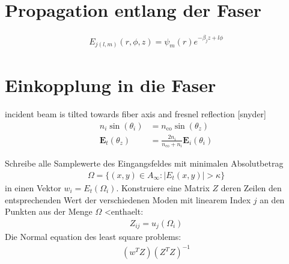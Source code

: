 \documentclass[DIV19,twocolumn]{scrartcl}
\newcommand{\vect}[1]{\mathbf{#1}}
\def\E{\vect E}
\newcommand{\nco}{n_\textrm{co}}
\newcommand{\Ainfty}{A_\infty}
\begin{document}
\section{Propagation entlang der Faser}
\begin{align}
E_{j(l,m)}(r,\phi,z) = \psi_m(r)e^{-\beta_j z+ l\phi}
\end{align}

\section{Einkopplung in die Faser}
incident beam is tilted towards fiber axis
and fresnel reflection 
[snyder]
\begin{align}
n_i \sin(\theta_i) &= \nco \sin(\theta_z)\\
\E_t(\theta_z) &= \frac{2 n_i}{\nco+n_i} \E_i(\theta_i)
\end{align}

Schreibe alle Samplewerte des Eingangsfeldes mit minimalen
Absolutbetrag
\begin{align}
  \Omega = \{(x,y)\in\Ainfty: |E_t(x,y)| > \kappa\}
\end{align}
in einen Vektor $w_i = E_t(\Omega_i)$. Konstruiere eine Matrix $Z$
deren Zeilen den entsprechenden Wert der verschiedenen Moden mit
linearem Index $j$ an den Punkten aus der Menge $\Omega$ <enthaelt:
\begin{align}
  Z_{ij} = u_j(\Omega_i) 
\end{align}
Die Normal equation des least square problems:
\begin{align}
(w^T Z) (Z^T Z)^{-1}
\end{align}
\end{document}

